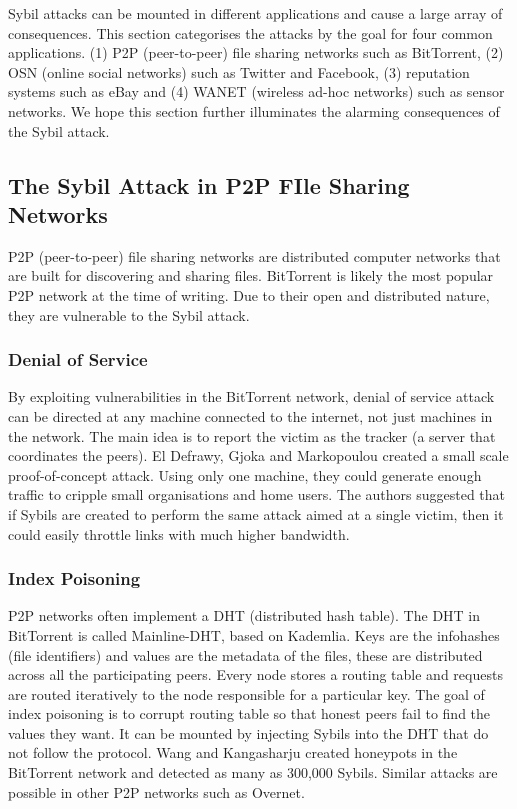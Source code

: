 Sybil attacks can be mounted in different applications and cause a large array
of consequences. This section categorises the attacks by the goal for four
common applications. (1) P2P (peer-to-peer) file sharing networks such as
BitTorrent, (2) OSN (online social networks) such as Twitter and Facebook, (3)
reputation systems such as eBay and (4) WANET (wireless ad-hoc networks) such as
sensor networks. We hope this section further illuminates the alarming
consequences of the Sybil attack.

\subsection{The Sybil Attack in P2P FIle Sharing Networks}
P2P (peer-to-peer) file sharing networks are distributed computer networks that
are built for discovering and sharing files. BitTorrent\cite{bep3} is likely the
most popular P2P network at the time of writing. Due to their open and
distributed nature, they are vulnerable to the Sybil attack.

\subsubsection{Denial of Service}
By exploiting vulnerabilities in the BitTorrent network, denial of service
attack can be directed at any machine connected to the internet, not just
machines in the network\cite{sia2006ddos}. The main idea is to report the victim
as the tracker (a server that coordinates the peers). El Defrawy, Gjoka and
Markopoulou created a small scale proof-of-concept attack. Using only one
machine, they could generate enough traffic to cripple small organisations and
home users. The authors suggested that if Sybils are created to perform the same
attack aimed at a single victim, then it could easily throttle links with much
higher bandwidth\cite{el2007bottorrent}.


\subsubsection{Index Poisoning}
P2P networks often implement a DHT (distributed hash table). The DHT in
BitTorrent is called Mainline-DHT, based on
Kademlia\cite{maymounkov2002kademlia}. Keys are the infohashes (file
identifiers) and values are the metadata of the files, these are distributed
across all the participating peers. Every node stores a routing table and
requests are routed iteratively to the node responsible for a particular
key\cite{bep5}. The goal of index poisoning is to corrupt routing table so that
honest peers fail to find the values they want. It can be mounted by injecting
Sybils into the DHT that do not follow the protocol. Wang and Kangasharju
created honeypots in the BitTorrent network and detected as many as 300,000
Sybils\cite{wang2012real}. Similar attacks are possible in other P2P networks
such as Overnet\cite{liang2006index}.

